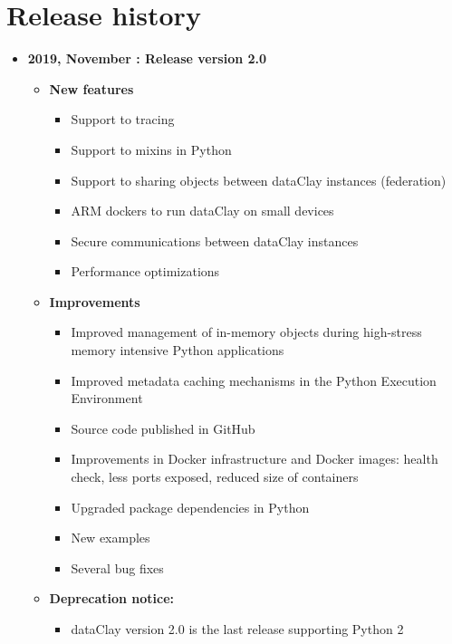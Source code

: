 \chapter*{Release history}

\begin{itemize}
\item[] \textbf{2019, November : Release version 2.0}\newline
    \begin{itemize}
    \item[] \textbf{New features}
        \begin{itemize}
            \item[] Support to tracing %
            \item[] Support to mixins in Python %
            \item[] Support to sharing objects between dataClay instances (federation)
            \item[] ARM dockers to run dataClay on small devices
            \item[] Secure communications between dataClay instances
            \item[] Performance optimizations %
        \end{itemize}
    \item[] \textbf{Improvements}
        \begin{itemize}
            \item[] Improved management of in-memory objects during high-stress memory intensive Python applications
            \item[] Improved metadata caching mechanisms in the Python Execution Environment
            \item[] Source code published in GitHub %
            \item[] Improvements in Docker infrastructure and Docker images: health check, less ports exposed, reduced size of containers 
            \item[] Upgraded package dependencies in Python
            \item[] New examples
            \item[] Several bug fixes
        \end{itemize}
    \item[] \textbf{Deprecation notice:}
        \begin{itemize}
            \item[] dataClay version 2.0 is the last release supporting Python 2
        \end{itemize}
    \end{itemize}
\end{itemize}
